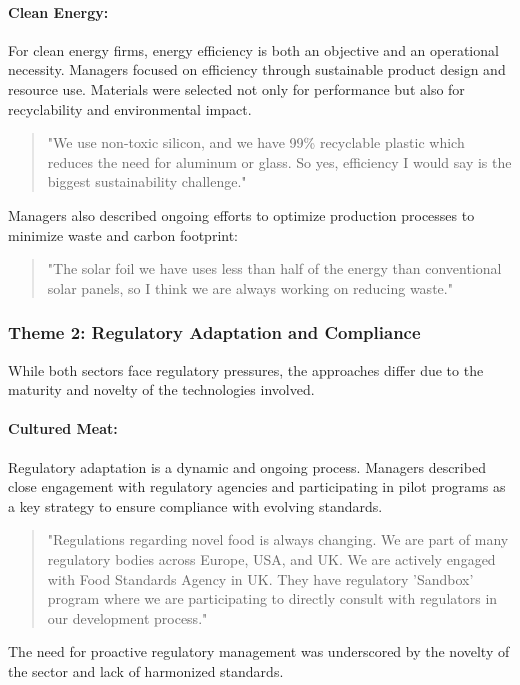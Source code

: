 \paragraph{Clean Energy:} For clean energy firms, energy efficiency is both an objective and an operational necessity. Managers focused on efficiency through sustainable product design and resource use. Materials were selected not only for performance but also for recyclability and environmental impact.
\begin{quote}
	"We use non-toxic silicon, and we have 99\% recyclable plastic which reduces the need for aluminum or glass. So yes, efficiency I would say is the biggest sustainability challenge."
\end{quote}
Managers also described ongoing efforts to optimize production processes to minimize waste and carbon footprint:
\begin{quote}
	"The solar foil we have uses less than half of the energy than conventional solar panels, so I think we are always working on reducing waste."
\end{quote}

\subsubsection{Theme 2: Regulatory Adaptation and Compliance}
While both sectors face regulatory pressures, the approaches differ due to the maturity and novelty of the technologies involved.

\paragraph{Cultured Meat:} Regulatory adaptation is a dynamic and ongoing process. Managers described close engagement with regulatory agencies and participating in pilot programs as a key strategy to ensure compliance with evolving standards.
\begin{quote}
	"Regulations regarding novel food is always changing. We are part of many regulatory bodies across Europe, USA, and UK. We are actively engaged with Food Standards Agency in UK. They have regulatory 'Sandbox' program where we are participating to directly consult with regulators in our development process."
\end{quote}
The need for proactive regulatory management was underscored by the novelty of the sector and lack of harmonized standards.

